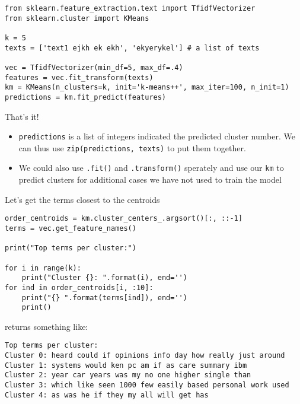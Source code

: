 \begin{frame}
\begin{lstlisting}
from sklearn.feature_extraction.text import TfidfVectorizer
from sklearn.cluster import KMeans

k = 5
texts = ['text1 ejkh ek ekh', 'ekyerykel'] # a list of texts

vec = TfidfVectorizer(min_df=5, max_df=.4)
features = vec.fit_transform(texts)
km = KMeans(n_clusters=k, init='k-means++', max_iter=100, n_init=1)
predictions = km.fit_predict(features)

\end{lstlisting}

That's it!
\pause

\begin{itemize}
\item \texttt{predictions} is a list of integers indicated the predicted cluster number. We can thus use \texttt{zip(predictions, texts)} to put them together.
\item<+-> We could also use \texttt{.fit()} and \texttt{.transform()} sperately and use our \texttt{km} to predict clusters for additional cases we have not used to train the model
\end{itemize}

\end{frame}


\begin{frame}{Let's get the terms closest to the centroids}
\begin{lstlisting}
order_centroids = km.cluster_centers_.argsort()[:, ::-1]
terms = vec.get_feature_names()

print("Top terms per cluster:")

for i in range(k):
    print("Cluster {}: ".format(i), end='')
for ind in order_centroids[i, :10]:
    print("{} ".format(terms[ind]), end='')
    print()
\end{lstlisting}
\pause
returns something like:

\begin{lstlisting}
Top terms per cluster:
Cluster 0: heard could if opinions info day how really just around 
Cluster 1: systems would ken pc am if as care summary ibm 
Cluster 2: year car years was my no one higher single than 
Cluster 3: which like seen 1000 few easily based personal work used 
Cluster 4: as was he if they my all will get has 
\end{lstlisting}
\end{frame}


